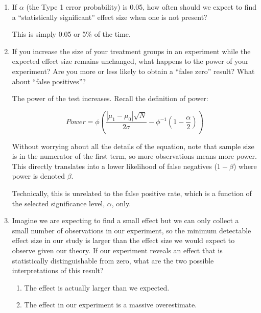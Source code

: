 \documentclass[a4paper,12pt]{exam}
\begin{document}
\begin{enumerate}
	\begin{enumerate}
	\item If $\alpha$ (the Type 1 error probability) is 0.05, how often should we expect to find a ``statistically significant'' effect size when one is not present?
	
	\begin{solution}
	
	This is simply 0.05 or 5\% of the time.
	
	\end{solution}
	
	\item If you increase the size of your treatment groups in an experiment while the expected effect size remains unchanged, what happens to the power of your experiment? Are you more or less likely to obtain a ``false zero'' result? What about ``false positives''?
	
	\begin{solution}
	
	The power of the test increases. Recall the definition of power:
	
	\begin{equation}
	Power = \phi\left( \frac{|\mu_1 - \mu_0|\sqrt{N}}{2\sigma} - \phi^{-1}\left( 1 - \frac{\alpha}{2} \right) \right)
	\end{equation}
	
	Without worrying about all the details of the equation, note that sample size is in the numerator of the first term, so more observations means more power. This directly translates into a lower likelihood of false negatives ($1-\beta$) where power is denoted $\beta$.
	
	Technically, this is unrelated to the false positive rate, which is a function of the selected significance level, $\alpha$, only.
	
	\end{solution}
	
	\item Imagine we are expecting to find a small effect but we can only collect a small number of observations in our experiment, so the minimum detectable effect size in our study is larger than the effect size we would expect to observe given our theory. If our experiment reveals an effect that is statistically distinguishable from zero, what are the two possible interpretations of this result?
	
	\begin{solution}
	
	\begin{enumerate}
	\item The effect is actually larger than we expected.
	\item The effect in our experiment is a massive overestimate.
	\end{enumerate}
	

\end{solution}
\end{enumerate}
\end{enumerate}
\end{document}
